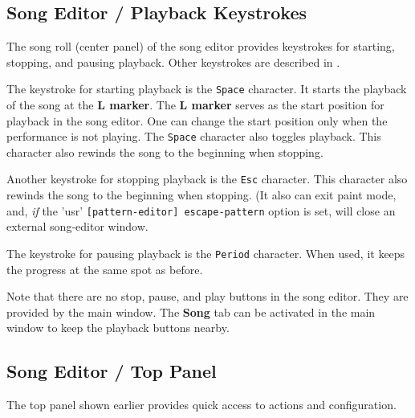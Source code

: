 \subsection{Song Editor / Playback Keystrokes}
\label{subsec:song_editor_playback_keystrokes}

   The song roll (center panel)
   of the song editor provides keystrokes for starting,
   stopping, and pausing playback.
   Other keystrokes are described in
   .


   The keystroke for starting playback is the \texttt{Space} character.
   It starts the playback of the song at the \textbf{L marker}.
   The \textbf{L marker} serves as the start position for playback
   in the song editor.  One can change the start position only when the
   performance is not playing.
   The \texttt{Space} character also toggles playback.
   This character also rewinds the song to the beginning when stopping.

   Another keystroke for stopping playback is the \texttt{Esc} character.
   This character also rewinds the song to the beginning when stopping.
   (It also can exit paint mode, and,
   \textsl{if} the 'usr' \texttt{[pattern-editor] escape-pattern}
   option is set, will close an external song-editor window.

   The keystroke for pausing playback is the \texttt{Period} character.
   When used, it keeps the progress at the same spot as before.

   Note that there are no stop, pause, and play buttons in the
   song editor.
   They are provided by the main window.
   The \textbf{Song} tab can be activated in the main window to
   keep the playback buttons nearby.

\subsection{Song Editor / Top Panel}
\label{subsec:song_editor_top}

   The top panel shown earlier provides quick access to actions
   and configuration.

